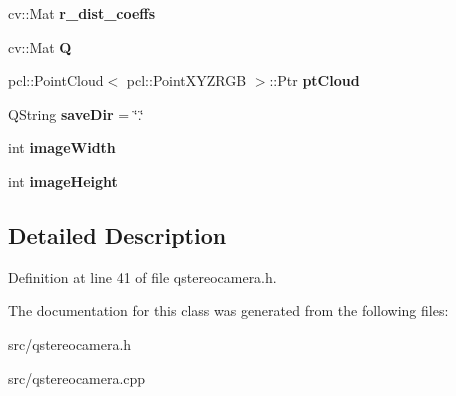 \begin{DoxyCompactItemize}
\item 
\hypertarget{class_q_stereo_camera_ae60ae5320f8cc33507b5d4c55b108317}{}cv\+::\+Mat {\bfseries r\+\_\+dist\+\_\+coeffs}\label{class_q_stereo_camera_ae60ae5320f8cc33507b5d4c55b108317}

\item 
\hypertarget{class_q_stereo_camera_ab115211419ed1dd0953b4aabfd7039b9}{}cv\+::\+Mat {\bfseries Q}\label{class_q_stereo_camera_ab115211419ed1dd0953b4aabfd7039b9}

\item 
\hypertarget{class_q_stereo_camera_aaa6194f9f12be746674fb356b0b7190a}{}pcl\+::\+Point\+Cloud$<$ pcl\+::\+Point\+X\+Y\+Z\+R\+G\+B $>$\+::Ptr {\bfseries pt\+Cloud}\label{class_q_stereo_camera_aaa6194f9f12be746674fb356b0b7190a}

\item 
\hypertarget{class_q_stereo_camera_aaccb16ea0cdf6bf2a01e5f6f38d09940}{}Q\+String {\bfseries save\+Dir} = \char`\"{}.\char`\"{}\label{class_q_stereo_camera_aaccb16ea0cdf6bf2a01e5f6f38d09940}

\item 
\hypertarget{class_q_stereo_camera_a5ce524846bec1143c6f4c648e2dd5d75}{}int {\bfseries image\+Width}\label{class_q_stereo_camera_a5ce524846bec1143c6f4c648e2dd5d75}

\item 
\hypertarget{class_q_stereo_camera_aa8c9d1b89f7975757d4b8e899147f294}{}int {\bfseries image\+Height}\label{class_q_stereo_camera_aa8c9d1b89f7975757d4b8e899147f294}

\end{DoxyCompactItemize}


\subsection{Detailed Description}


Definition at line 41 of file qstereocamera.\+h.



The documentation for this class was generated from the following files\+:\begin{DoxyCompactItemize}
\item 
src/qstereocamera.\+h\item 
src/qstereocamera.\+cpp\end{DoxyCompactItemize}

